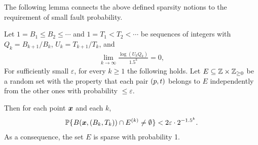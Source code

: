 \documentclass[12pt]{memoir}
\renewcommand{\le}{\leq}
\renewcommand{\ge}{\geq}
\def\B{B}
\def\U{U}
\newcommand{\Tu}{T}
\begin{document}
The following lemma connects the above defined sparsity notions to the requirement
of small fault probability.

\begin{lemma}[Sparsity]\label{lem:sparsiness}
Let \( 1=\B_{1}\le  \B_{2}\le\dotsm \) and 
\( 1=\Tu_{1}<T_{2}<\dotsm \) be sequences of integers with
\( Q_k = \B_{k+1}/\B_{k} \), \( \U_k = \Tu_{k+1}/\Tu_{k} \), and
\begin{align}\label{eq:assumption}
  \lim_{k\rightarrow\infty}\frac{\log(\U_{k} Q_k)}{1.5^k}=0,
\end{align}
For sufficiently small \( \varepsilon \), for every \( k\ge 1 \) the following holds.
Let \( E\subseteq \bbZ\times \bbZ_{\ge 0} \)
be a random set with the property that each pair \( (p,t) \) belongs to \( E \)
independently from the other ones with probability \( \le \varepsilon \).

Then for each point \( \boldsymbol{x} \)  and each \( k \),
 \begin{align*}
   \Pbof{B(\vek{x},(\B_k, \Tu_{k}))\cap E^{(k)}\neq\emptyset} <2\varepsilon \cdot 2^{-1.5^{k}}.
 \end{align*}
As a consequence, the set \( E \) is sparse with probability 1.
\end{lemma}
\end{document}
